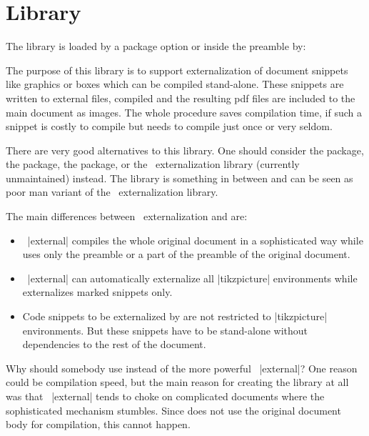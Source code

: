 \clearpage
\section{Library }\label{sec:external}%
%
The library is loaded by a package option or inside the preamble by:
\begin{dispListing}
\end{dispListing}

The purpose of this library is to support externalization of document
snippets like graphics or boxes which can be compiled stand-alone.
These snippets are written to external files, compiled and the resulting
pdf files are included to the main document as images.
The whole procedure saves compilation time, if such a snippet is costly to
compile but needs to compile just once or very seldom.

There are very good alternatives to this library. One should consider
the  package,
the  package,
the  package,
or the \tikzname\ externalization library (currently unmaintained)
instead.
The  library is something in between and can be seen as
poor man variant of the \tikzname\ externalization library.

The main differences between \tikzname\ externalization and  are:
\begin{itemize}
\item\tikzname\ |external| compiles the whole original document in a sophisticated
  way while  uses only the preamble or a part of the preamble
  of the original document.
\item\tikzname\ |external| can automatically externalize all |tikzpicture|
  environments while  externalizes marked snippets only.
\item Code snippets to be externalized by  are not restricted to
  |tikzpicture| environments. But these snippets have to be stand-alone without
  dependencies to the rest of the document.
\end{itemize}
Why should somebody use  instead of the more powerful \tikzname\ |external|?
One reason could be compilation speed, but the main reason for creating the
library at all was that \tikzname\ |external| tends to choke on complicated
documents where the sophisticated mechanism stumbles. Since  does
not use the original document body for compilation, this cannot happen.

